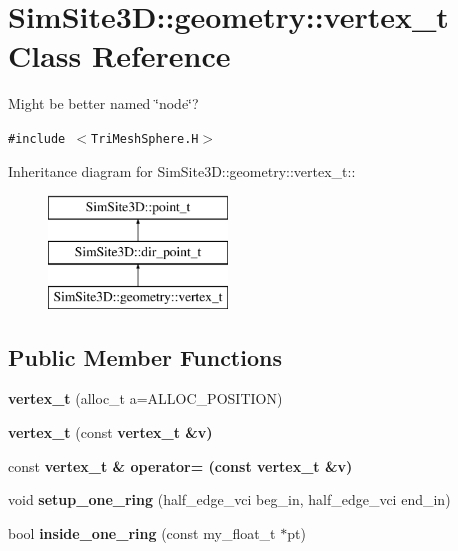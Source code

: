 \section{SimSite3D::geometry::vertex\_\-t Class Reference}
\label{classSimSite3D_1_1geometry_1_1vertex__t}
Might be better named \char`\"{}node\char`\"{}?  


{\tt \#include $<$Tri\-Mesh\-Sphere.H$>$}

Inheritance diagram for SimSite3D::geometry::vertex\_\-t::\begin{figure}[H]
\begin{center}
\leavevmode
\includegraphics[height=3cm]{classSimSite3D_1_1geometry_1_1vertex__t}
\end{center}
\end{figure}
\subsection*{Public Member Functions}
\begin{CompactItemize}
\item 
\textbf{vertex\_\-t} (alloc\_\-t a=ALLOC\_\-POSITION)\label{classSimSite3D_1_1geometry_1_1vertex__t_b26d405918f18263845710e1cbdbd478}

\item 
\textbf{vertex\_\-t} (const \bf{vertex\_\-t} \&v)\label{classSimSite3D_1_1geometry_1_1vertex__t_369761b4291cb2a821f12dd56e409eb7}

\item 
const \bf{vertex\_\-t} \& \textbf{operator=} (const \bf{vertex\_\-t} \&v)\label{classSimSite3D_1_1geometry_1_1vertex__t_9073d65a8993b63729b0ddea759c7cd6}

\item 
void \textbf{setup\_\-one\_\-ring} (half\_\-edge\_\-vci beg\_\-in, half\_\-edge\_\-vci end\_\-in)\label{classSimSite3D_1_1geometry_1_1vertex__t_10f4bc8c2b1f885ebe29a995acdb3d31}

\item 
bool \textbf{inside\_\-one\_\-ring} (const my\_\-float\_\-t $\ast$pt)\label{classSimSite3D_1_1geometry_1_1vertex__t_107f530235423b366efbcd69c33d8f21}

\end{CompactItemize}
